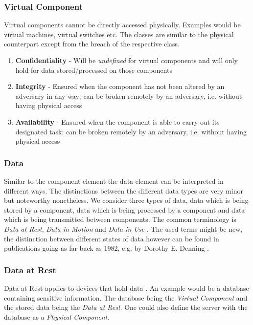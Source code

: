 \subsubsection*{Virtual Component}

Virtual components cannot be directly accessed physically. Examples would be virtual machines, virtual switches etc. The classes are similar to the physical counterpart except from the breach of the respective class.

\begin{enumerate}
\item \textbf{Confidentiality} - Will be \textit{undefined} for virtual components and will only hold for data stored/processed on those components
\item \textbf{Integrity} - Ensured when the component has not been altered by an adversary in any way; can be broken remotely by an adversary, i.e. without having physical access
\item \textbf{Availability} - Ensured when the component is able to carry out its designated task; can be broken remotely by an adversary, i.e. without having physical access
\end{enumerate}

\subsubsection{Data}

Similar to the component element the data element can be interpreted in different ways.
The distinctions between the different data types are very minor but noteworthy nonetheless. We consider three types of data, data which is being stored by a component, data which is being processed by a component and data which is being transmitted between components. The common terminology is \textit{Data at Rest}, \textit{Data in Motion} and \textit{Data in Use} \cite{kanagasingham2008data}. The used terms might be new, the distinction between different states of data however can be found in publications going as far back as 1982, e.g. by Dorothy E. Denning \cite{robling1982cryptography}.

\subsubsection*{Data at Rest}

Data at Rest applies to devices that hold data \cite{kanagasingham2008data}. An example would be a database containing sensitive information. The database being the \textit{Virtual Component} and the stored data being the \textit{Data at Rest}. One could also define the server with the database as a \textit{Physical Component}.

